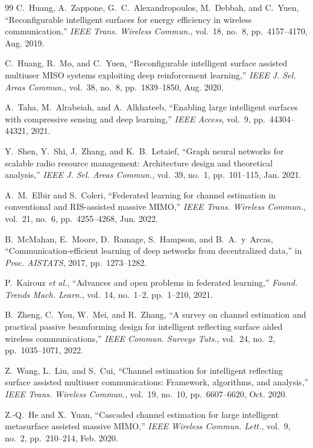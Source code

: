 \documentclass[journal]{IEEEtran}
\begin{document}
\begin{thebibliography}{99}
C.~Huang, A.~Zappone, G.~C.~Alexandropoulos, M.~Debbah, and C.~Yuen, ``Reconfigurable intelligent surfaces for energy efficiency in wireless communication,'' \emph{IEEE Trans. Wireless Commun.}, vol.~18, no.~8, pp.~4157--4170, Aug. 2019.

C.~Huang, R.~Mo, and C.~Yuen, ``Reconfigurable intelligent surface assisted multiuser MISO systems exploiting deep reinforcement learning,'' \emph{IEEE J. Sel. Areas Commun.}, vol.~38, no.~8, pp.~1839--1850, Aug. 2020.

A.~Taha, M.~Alrabeiah, and A.~Alkhateeb, ``Enabling large intelligent surfaces with compressive sensing and deep learning,'' \emph{IEEE Access}, vol.~9, pp.~44304--44321, 2021.

Y.~Shen, Y.~Shi, J.~Zhang, and K.~B.~Letaief, ``Graph neural networks for scalable radio resource management: Architecture design and theoretical analysis,'' \emph{IEEE J. Sel. Areas Commun.}, vol.~39, no.~1, pp.~101--115, Jan. 2021.

A.~M.~Elbir and S.~Coleri, ``Federated learning for channel estimation in conventional and RIS-assisted massive MIMO,'' \emph{IEEE Trans. Wireless Commun.}, vol.~21, no.~6, pp.~4255--4268, Jun. 2022.

B.~McMahan, E.~Moore, D.~Ramage, S.~Hampson, and B.~A.~y~Arcas, ``Communication-efficient learning of deep networks from decentralized data,'' in \emph{Proc. AISTATS}, 2017, pp.~1273--1282.

P.~Kairouz \emph{et al.}, ``Advances and open problems in federated learning,'' \emph{Found. Trends Mach. Learn.}, vol.~14, no.~1--2, pp.~1--210, 2021.

B.~Zheng, C.~You, W.~Mei, and R.~Zhang, ``A survey on channel estimation and practical passive beamforming design for intelligent reflecting surface aided wireless communications,'' \emph{IEEE Commun. Surveys Tuts.}, vol.~24, no.~2, pp.~1035--1071, 2022.

Z.~Wang, L.~Liu, and S.~Cui, ``Channel estimation for intelligent reflecting surface assisted multiuser communications: Framework, algorithms, and analysis,'' \emph{IEEE Trans. Wireless Commun.}, vol.~19, no.~10, pp.~6607--6620, Oct. 2020.

Z.-Q.~He and X.~Yuan, ``Cascaded channel estimation for large intelligent metasurface assisted massive MIMO,'' \emph{IEEE Wireless Commun. Lett.}, vol.~9, no.~2, pp.~210--214, Feb. 2020.


\end{thebibliography}
\end{document}
